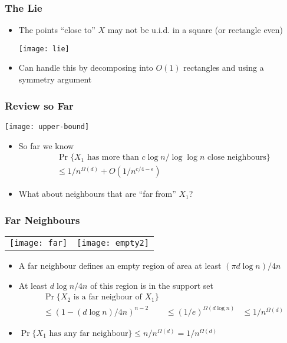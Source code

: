 \documentclass{beamer}
\begin{document}
\frame
{
  \frametitle{The Lie}

   \begin{itemize}
     \item The points ``close to'' $X$ may not be u.i.d. in a square (or
rectangle even)
      \begin{center}
        \texttt{[image: lie]} 
      \end{center}
     \item Can handle this by decomposing into $O(1)$ rectangles and using
           a symmetry argument
   \end{itemize}
}




\frame
{
  \frametitle{Review so Far}

  \begin{center}
    \texttt{[image: upper-bound]}
  \end{center}
   \begin{itemize}
     \item So far we know
       \[
         \begin{aligned}
          &\Pr\{\mbox{$X_1$ has more than $c\log n/\log\log n$ close neighbours}\} \\
          & \le 1/n^{\Omega(d)} + O(1/n^{c/4-\epsilon}) 
         \end{aligned}
       \]
     \item What about neighbours that are ``far from'' $X_1$?
   \end{itemize}
}


\frame
{
  \frametitle{Far Neighbours}

  \begin{center}
    \begin{tabular}{cc}
      \texttt{[image: far]} &
	\texttt{[image: empty2]}
    \end{tabular}
  \end{center}
   \begin{itemize}
     \item A far neighbour defines an empty region of area at least
           $(\pi d\log n)/4n$
     \item At least $d\log n/4n$ of this region is in the support set
       \[
         \begin{aligned}
          &\Pr\{\mbox{$X_2$ is a far neigbour of $X_1$}\} \\
          & \le (1-(d\log n)/4n)^{n-2}
          & \le (1/e)^{\Omega(d\log n)}
          & \le 1/n^{\Omega(d)}
         \end{aligned}
       \]
      \item 
       $\Pr\{\mbox{$X_1$ has any far neighbour}\} 
           \le n/n^{\Omega(d)} 
           = 1/n^{\Omega(d)}$
   \end{itemize}
}
\end{document}
